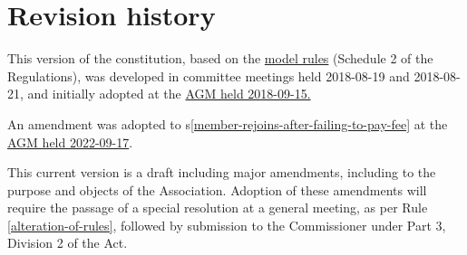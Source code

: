 \documentclass[../constitution.tex]{subfiles}
\begin{document}
\part*{Revision history}

This version of the constitution, based on the \href{https://www.commerce.wa.gov.au/consumer-protection/model-rules}{model rules} (Schedule 2 of the Regulations), was developed in committee meetings held 2018-08-19 and 2018-08-21, and initially adopted at the \href{https://wiki.artifactory.org.au/en/minutes/AGM/2018-09-15}{AGM held 2018-09-15.}

An amendment was adopted to s\ref{member-rejoins-after-failing-to-pay-fee} at the \href{https://wiki.artifactory.org.au/en/minutes/AGM/2022-09-17}{AGM held 2022-09-17}.

This current version is a draft including major amendments, including to the purpose and objects of the Association. Adoption of these amendments will require the passage of a special resolution at a general meeting, as per Rule \ref{alteration-of-rules}, followed by submission to the Commissioner under Part 3, Division 2 of the Act.
\end{document}
